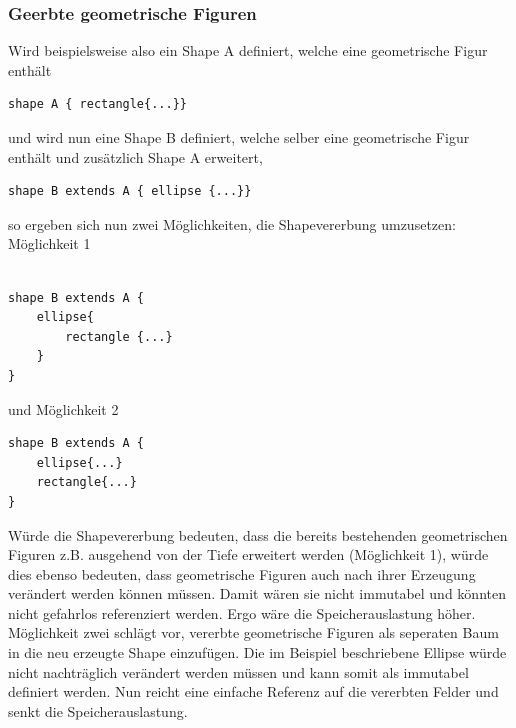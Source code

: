 \subsubsection{Geerbte geometrische Figuren}
Wird beispielsweise also ein Shape A definiert, welche eine geometrische Figur enthält
\begin{lstlisting}[style=scala]
shape A { rectangle{...}}
\end{lstlisting}
und wird nun eine Shape B definiert, welche selber eine geometrische Figur enthält und zusätzlich Shape A erweitert,
\begin{lstlisting}[style=scala]
shape B extends A { ellipse {...}}
\end{lstlisting}so ergeben sich nun zwei Möglichkeiten, die Shapevererbung umzusetzen:\linebreak
Möglichkeit 1
\begin{lstlisting}[style=scala, aboveskip=0pt]

shape B extends A {
    ellipse{
        rectangle {...}
    }
}
\end{lstlisting}
und Möglichkeit 2
\begin{lstlisting}[style=scala, aboveskip=0pt]
shape B extends A {
    ellipse{...}
    rectangle{...}
}
\end{lstlisting}Würde die Shapevererbung bedeuten, dass die bereits bestehenden geometrischen Figuren z.B. ausgehend von der Tiefe erweitert werden (Möglichkeit 1), würde dies ebenso bedeuten, dass geometrische Figuren auch nach ihrer Erzeugung verändert werden können müssen. Damit wären sie nicht immutabel und könnten nicht gefahrlos referenziert werden. Ergo wäre die Speicherauslastung höher. Möglichkeit zwei schlägt vor, vererbte geometrische Figuren als seperaten Baum in die neu erzeugte Shape einzufügen. Die im Beispiel beschriebene Ellipse würde nicht nachträglich verändert werden müssen und kann somit als immutabel definiert werden. Nun reicht eine einfache Referenz auf die vererbten Felder und senkt die Speicherauslastung.
